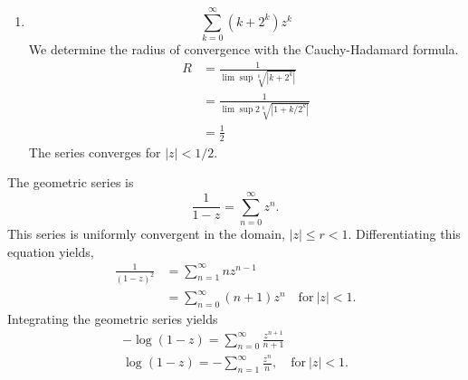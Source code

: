{\begin{Solution}
\begin{enumerate}
    \begin{gather*}
      \lim_{k \to \infty} \left| \frac{ (z + \imath 5)^{2 (k+1)} (k + 2)^2 }
        { (z + \imath 5)^{2 k} (k + 1)^2 } \right| < 1
      \\
      |z + \imath 5|^2 \lim_{k \to \infty} \left| \frac{ (k + 2)^2 }{ (k + 1)^2 } \right| < 1
      \\
      |z + \imath 5|^2 \lim_{k \to \infty} \frac{ 2 (k + 2) }{ 2 (k + 1) } < 1
      \\
      |z + \imath 5|^2 \lim_{k \to \infty} \frac{ 2 }{ 2 } < 1
      \\
      |z + \imath 5|^2 < 1
    \end{gather*}
  \item 
    \[
    \sum_{k=0}^\infty (k + 2^k) z^k
    \]
    We determine the radius of convergence with the Cauchy-Hadamard formula.
    \begin{align*}
      R
      &= \frac{ 1 }{ \lim \sup \sqrt[k]{ \left| k + 2^k \right| } }
      \\
      &= \frac{ 1 }{ \lim \sup 2 \sqrt[k]{ \left| 1 + k / 2^k \right| } }
      \\
      &= \frac{1}{2}
    \end{align*}
    The series converges for $|z| < 1 / 2$.
  \end{enumerate}
\end{Solution}




\begin{Solution}
  \label{solution sum (n+1)z^n}
  The geometric series is
  \[ 
  \frac{1}{1 - z} = \sum_{n = 0}^\infty z^n. 
  \]
  This series is uniformly convergent in the domain, $|z| \leq r < 1$.  
  Differentiating this equation yields,
  \begin{align*}
    \frac{1}{(1 - z)^2}
    &= \sum_{n = 1}^\infty n z^{n-1} 
    \\
    &= \sum_{n = 0}^\infty (n + 1) z^n \quad \mathrm{for}\ |z| < 1.
  \end{align*}
  Integrating the geometric series yields
  \begin{gather*}
    -\log(1 - z) = \sum_{n = 0}^\infty \frac{z^{n+1}}{n+1} 
    \\
    \log(1 - z) = - \sum_{n = 1}^\infty \frac{z^n}{n}, \quad \mathrm{for}\ |z| < 1.
  \end{gather*}
\end{Solution}


}
